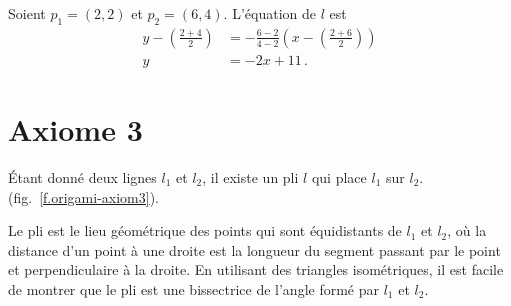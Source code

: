\begin{example}
Soient $p_1=(2,2)$ et $p_2=(6,4)$. L'équation de $l$ est 
\begin{align*}
y-\left(\frac{2+4}{2}\right)&=-\frac{6-2}{4-2}\left(x-\left(\frac{2+6}{2}\right)\right)\\
y&=-2x+11\,.
\end{align*}
\end{example}



\section{Axiome 3}\label{s.ax3}


\begin{axiom}
Étant donné deux lignes $l_1$ et $l_2$, il existe un pli $l$ qui place $l_1$ sur $l_2$. (fig.~\ref{f.origami-axiom3}).
\end{axiom}

Le pli est le lieu géométrique des points qui sont équidistants de $l_1$ et $l_2$, où la distance d'un point à une droite est la longueur du segment passant par le point et perpendiculaire à la droite. En utilisant des triangles isométriques, il est facile de montrer que le pli est une bissectrice de l'angle formé par $l_1$ et $l_2$.


